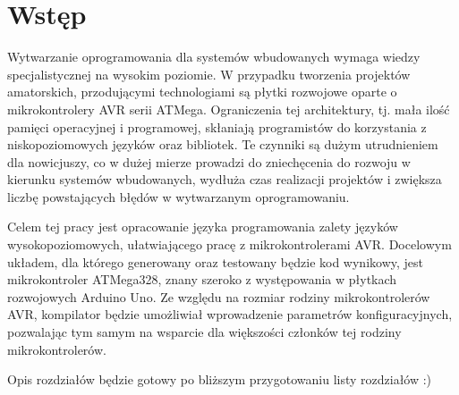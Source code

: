 \chapter{Wstęp}
\label{ch:wstep}


Wytwarzanie oprogramowania dla systemów wbudowanych wymaga wiedzy specjalistycznej na wysokim poziomie. W przypadku tworzenia projektów amatorskich, przodującymi technologiami są płytki rozwojowe oparte o mikrokontrolery AVR serii ATMega. Ograniczenia tej architektury, tj. mała ilość pamięci operacyjnej i programowej, skłaniają programistów do korzystania z niskopoziomowych języków oraz bibliotek. Te czynniki są dużym utrudnieniem dla nowicjuszy, co w dużej mierze prowadzi do zniechęcenia do rozwoju w kierunku systemów wbudowanych, wydłuża czas realizacji projektów i zwiększa liczbę powstających błędów w wytwarzanym oprogramowaniu.

Celem tej pracy jest opracowanie języka programowania  zalety języków wysokopoziomowych, ułatwiającego pracę z mikrokontrolerami AVR. Docelowym układem, dla którego generowany oraz testowany będzie kod wynikowy, jest mikrokontroler ATMega328, znany szeroko z występowania w płytkach rozwojowych Arduino Uno. Ze względu na rozmiar rodziny mikrokontrolerów AVR, kompilator będzie umożliwiał wprowadzenie parametrów konfiguracyjnych, pozwalając tym samym na wsparcie dla większości członków tej rodziny mikrokontrolerów. 


Opis rozdziałów będzie gotowy po bliższym przygotowaniu listy rozdziałów :)


